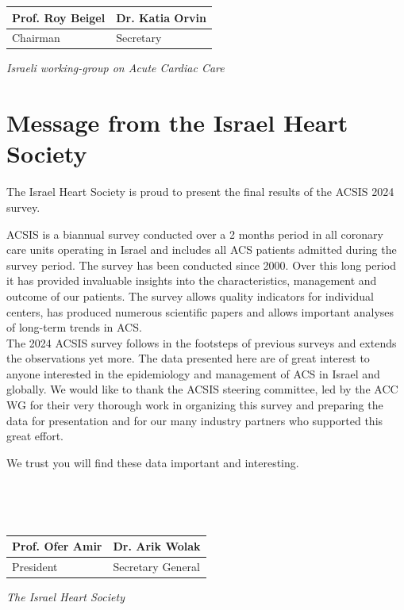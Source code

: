 \documentclass[
]{article}
\begin{document}
\begin{tabu} to 
\toprule
Prof. Roy Beigel & Dr. Katia Orvin\\
\midrule
Chairman & Secretary\\
\bottomrule
\end{tabu}

\emph{Israeli working-group on Acute Cardiac Care}

\pagebreak

\section{Message from the Israel Heart
Society}\label{message-from-the-israel-heart-society}

The Israel Heart Society is proud to present the final results of the
ACSIS 2024 survey.

ACSIS is a biannual survey conducted over a 2 months period in all
coronary care units operating in Israel and includes all ACS patients
admitted during the survey period. The survey has been conducted since
2000. Over this long period it has provided invaluable insights into the
characteristics, management and outcome of our patients. The survey
allows quality indicators for individual centers, has produced numerous
scientific papers and allows important analyses of long-term trends in
ACS.\\
The 2024 ACSIS survey follows in the footsteps of previous surveys and
extends the observations yet more. The data presented here are of great
interest to anyone interested in the epidemiology and management of ACS
in Israel and globally. We would like to thank the ACSIS steering
committee, led by the ACC WG for their very thorough work in organizing
this survey and preparing the data for presentation and for our many
industry partners who supported this great effort.

We trust you will find these data important and interesting.

~

~

\begin{tabu} to 
\toprule
Prof. Ofer Amir & Dr. Arik Wolak\\
\midrule
President & Secretary General\\
\bottomrule
\end{tabu}

\emph{The Israel Heart Society}
\end{document}
